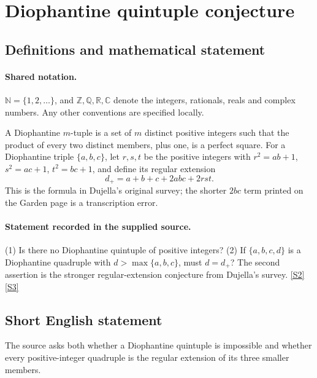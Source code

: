 \documentclass[11pt]{article}
\newcommand{\sref}[2]{\hyperlink{source:#1:#2}{[S#2]}}
\begin{document}
\section{Diophantine quintuple conjecture}\label{statement}

\subsection{Definitions and mathematical statement}

\paragraph{Shared notation.}$\mathbb N=\{1,2,\ldots\}$, and $\mathbb Z,\mathbb Q,\mathbb R,\mathbb C$ denote the integers, rationals, reals and complex numbers. Any other conventions are specified locally.


A Diophantine $m$-tuple is a set of $m$ distinct positive integers such that the product of every two distinct members, plus one, is a perfect square. For a Diophantine triple $\{a,b,c\}$, let $r,s,t$ be the positive integers with $r^2=ab+1$, $s^2=ac+1$, $t^2=bc+1$, and define its regular extension\[ d_+=a+b+c+2abc+2rst. \] This is the formula in Dujella's original survey; the shorter $2bc$ term printed on the Garden page is a transcription error.
\paragraph{Statement recorded in the supplied source.}
(1) Is there no Diophantine quintuple of positive integers? (2) If $\{a,b,c,d\}$ is a Diophantine quadruple with $d>\max\{a,b,c\}$, must $d=d_+$? The second assertion is the stronger regular-extension conjecture from Dujella's survey. \sref{statement}{2} \sref{statement}{3}
\subsection{Short English statement}
The source asks both whether a Diophantine quintuple is impossible and whether every positive-integer quadruple is the regular extension of its three smaller members.
\end{document}
